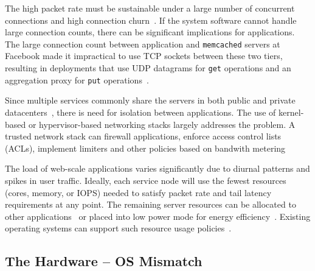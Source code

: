 The high packet rate must be sustainable under a large number of
concurrent connections and high connection
churn~\cite{theC10Mproblem}. If the system software cannot handle
large connection counts, there can be significant implications for
applications.  The large connection count between
application and \texttt{memcached} servers at Facebook made it
impractical to use TCP sockets between these two tiers, resulting in
deployments that use UDP datagrams for \texttt{get} operations and an
aggregation proxy for \texttt{put}
operations~\cite{DBLP:conf/nsdi/NishtalaFGKLLMPPSSTV13}.

 Since multiple services commonly share the
servers in both public and private
datacenters~\cite{DBLP:journals/cacm/DeanB13,Hindman:2011:MPF,Schwarzkopf:2013:OFS},
there is need for isolation between applications. The use of
kernel-based or hypervisor-based networking stacks largely addresses
the problem. A trusted network stack can firewall applications,
enforce access control lists (ACLs), implement limiters and other
policies based on bandwith metering

 The load of web-scale applications
varies significantly due to diurnal patterns and spikes in user
traffic. Ideally, each service node will use the fewest resources
(cores, memory, or IOPS) needed to satisfy packet rate and tail
latency requirements at any point. The remaining server resources can
be allocated to other
applications~\cite{DBLP:conf/asplos/DelimitrouK14,Hindman:2011:MPF} or
placed into low power mode for energy
efficiency~\cite{DBLP:journals/computer/BarrosoH07}. Existing
operating systems can support such resource usage
policies~\cite{DBLP:conf/eurosys/LeverichK14,DBLP:conf/isca/LoCGBK14}.

\subsection{The Hardware -- OS Mismatch}
\label{sec:motivation:web}

